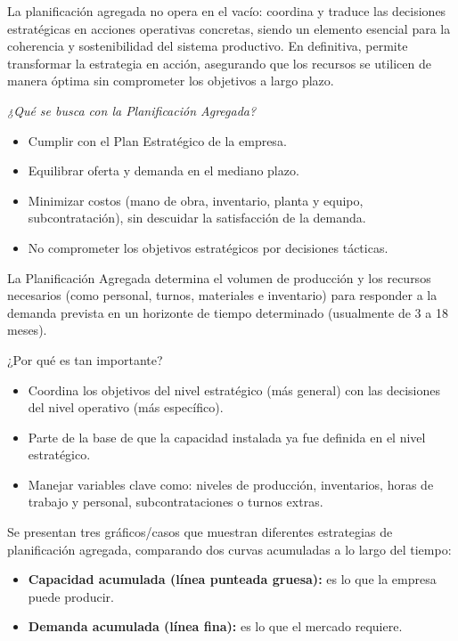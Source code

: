 \documentclass[a4paper,oneside,11pt]{article}
\begin{document}
La planificación agregada no opera en el vacío: coordina y traduce las decisiones estratégicas en acciones operativas concretas, siendo un elemento esencial para la coherencia y sostenibilidad del sistema productivo. En definitiva, permite transformar la estrategia en acción, asegurando que los recursos se utilicen de manera óptima sin comprometer los objetivos a largo plazo.

\textit{¿Qué se busca con la Planificación Agregada?}

\begin{itemize}
    \item Cumplir con el Plan Estratégico de la empresa.
    \item Equilibrar oferta y demanda en el mediano plazo.
    \item Minimizar costos (mano de obra, inventario, planta y equipo, subcontratación), sin descuidar la satisfacción de la demanda.
    \item No comprometer los objetivos estratégicos por decisiones tácticas.
    
\end{itemize}

La Planificación Agregada determina el volumen de producción y los recursos necesarios (como personal, turnos, materiales e inventario) para responder a la demanda prevista en un horizonte de tiempo determinado (usualmente de 3 a 18 meses).

¿Por qué es tan importante?
\begin{itemize}
    \item Coordina los objetivos del nivel estratégico (más general) con las decisiones del nivel operativo (más específico).
    \item Parte de la base de que la capacidad instalada ya fue definida en el nivel estratégico.
    \item Manejar variables clave como: niveles de producción, inventarios, horas de trabajo y personal, subcontrataciones o turnos extras.
\end{itemize}

Se presentan tres gráficos/casos que muestran diferentes estrategias de planificación agregada, comparando dos curvas acumuladas a lo largo del tiempo:
\begin{itemize}
    \item \textbf{Capacidad acumulada (línea punteada gruesa):} es lo que la empresa puede producir.
    \item \textbf{Demanda acumulada (línea fina):} es lo que el mercado requiere.
\end{itemize}
\end{document}
